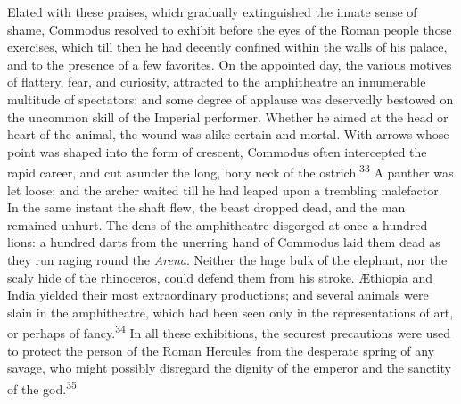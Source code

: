 
Elated with these praises, which gradually extinguished the
innate sense of shame, Commodus resolved to exhibit before the
eyes of the Roman people those exercises, which till then he had
decently confined within the walls of his palace, and to the
presence of a few favorites. On the appointed day, the various
motives of flattery, fear, and curiosity, attracted to the
amphitheatre an innumerable multitude of spectators; and some
degree of applause was deservedly bestowed on the uncommon skill
of the Imperial performer. Whether he aimed at the head or heart
of the animal, the wound was alike certain and mortal. With
arrows whose point was shaped into the form of crescent, Commodus
often intercepted the rapid career, and cut asunder the long,
bony neck of the ostrich.\textsuperscript{33} A panther was let loose; and the
archer waited till he had leaped upon a trembling malefactor. In
the same instant the shaft flew, the beast dropped dead, and the
man remained unhurt. The dens of the amphitheatre disgorged at
once a hundred lions: a hundred darts from the unerring hand of
Commodus laid them dead as they run raging round the \textit{Arena}.
Neither the huge bulk of the elephant, nor the scaly hide of the
rhinoceros, could defend them from his stroke. Æthiopia and India
yielded their most extraordinary productions; and several animals
were slain in the amphitheatre, which had been seen only in the
representations of art, or perhaps of fancy.\textsuperscript{34} In all these
exhibitions, the securest precautions were used to protect the
person of the Roman Hercules from the desperate spring of any
savage, who might possibly disregard the dignity of the emperor
and the sanctity of the god.\textsuperscript{35}



